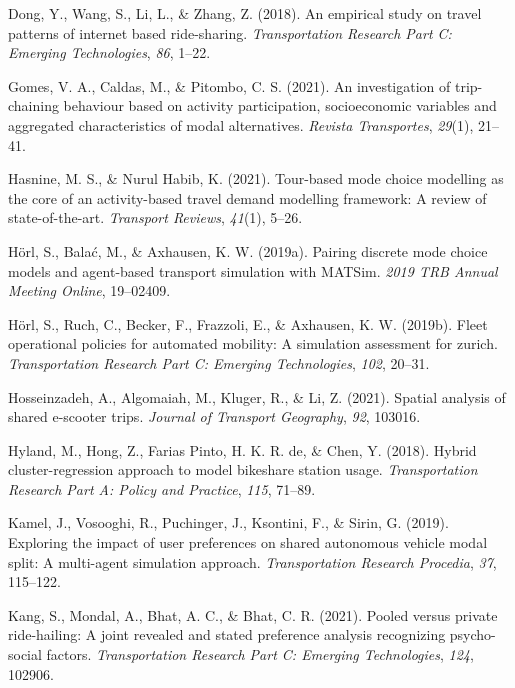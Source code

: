 \documentclass[fancy, masters]{byuthesis}
\newlength{\cslhangindent}
\newlength{\cslentryspacingunit} %
\newenvironment{CSLReferences}[2] %
 {%
  \setlength{\parindent}{0pt}
  \ifodd #1
  \let\oldpar\par
  \def\par{\hangindent=\cslhangindent\oldpar}
  \fi
  \setlength{\parskip}{#2\cslentryspacingunit}
 }%
 {}
\begin{document}
\begin{CSLReferences}{1}{0}
\leavevmode{}%
Dong, Y., Wang, S., Li, L., \& Zhang, Z. (2018). An empirical study on travel patterns of internet based ride-sharing. \emph{Transportation Research Part C: Emerging Technologies}, \emph{86}, 1--22.

\leavevmode{}%
Gomes, V. A., Caldas, M., \& Pitombo, C. S. (2021). An investigation of trip-chaining behaviour based on activity participation, socioeconomic variables and aggregated characteristics of modal alternatives. \emph{Revista Transportes}, \emph{29}(1), 21--41.

\leavevmode{}%
Hasnine, M. S., \& Nurul Habib, K. (2021). Tour-based mode choice modelling as the core of an activity-based travel demand modelling framework: A review of state-of-the-art. \emph{Transport Reviews}, \emph{41}(1), 5--26.

\leavevmode{}%
Hörl, S., Balać, M., \& Axhausen, K. W. (2019a). Pairing discrete mode choice models and agent-based transport simulation with MATSim. \emph{2019 TRB Annual Meeting Online}, 19--02409.

\leavevmode{}%
Hörl, S., Ruch, C., Becker, F., Frazzoli, E., \& Axhausen, K. W. (2019b). Fleet operational policies for automated mobility: A simulation assessment for zurich. \emph{Transportation Research Part C: Emerging Technologies}, \emph{102}, 20--31.

\leavevmode{}%
Hosseinzadeh, A., Algomaiah, M., Kluger, R., \& Li, Z. (2021). Spatial analysis of shared e-scooter trips. \emph{Journal of Transport Geography}, \emph{92}, 103016.

\leavevmode{}%
Hyland, M., Hong, Z., Farias Pinto, H. K. R. de, \& Chen, Y. (2018). Hybrid cluster-regression approach to model bikeshare station usage. \emph{Transportation Research Part A: Policy and Practice}, \emph{115}, 71--89.

\leavevmode{}%
Kamel, J., Vosooghi, R., Puchinger, J., Ksontini, F., \& Sirin, G. (2019). Exploring the impact of user preferences on shared autonomous vehicle modal split: A multi-agent simulation approach. \emph{Transportation Research Procedia}, \emph{37}, 115--122.

\leavevmode{}%
Kang, S., Mondal, A., Bhat, A. C., \& Bhat, C. R. (2021). Pooled versus private ride-hailing: A joint revealed and stated preference analysis recognizing psycho-social factors. \emph{Transportation Research Part C: Emerging Technologies}, \emph{124}, 102906.


\end{CSLReferences}
\end{document}
